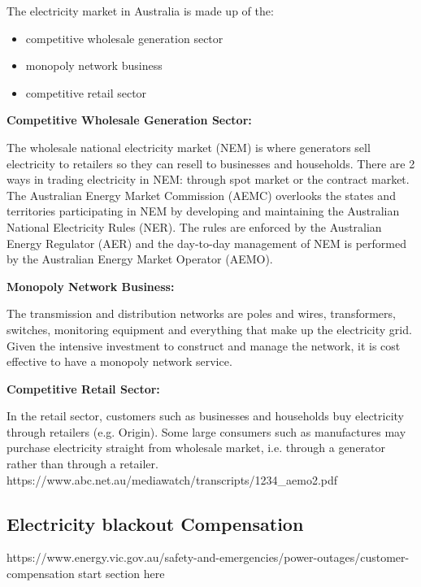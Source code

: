 \documentclass[12pt]{article}
\begin{document}
\begin{flushleft}
The electricity market in Australia is made up of the:
\begin{itemize}
 \item competitive wholesale generation sector
 \item monopoly network business
 \item competitive retail sector\parencite{aemc2}
\end{itemize}
{\textbf{\large Competitive Wholesale Generation Sector:}}\par
The wholesale national electricity market (NEM) is where generators sell electricity to retailers so they can resell to businesses and households. There are 2 ways in trading electricity in NEM: through spot market or the contract market.\parencite{aemc2} The Australian Energy Market Commission (AEMC) overlooks the states and territories participating in NEM by developing and maintaining the Australian National Electricity Rules (NER). The rules are enforced by the Australian Energy Regulator (AER) and the day-to-day management of NEM is performed by the Australian Energy Market Operator (AEMO).\parencite{aemo1} \par
{\textbf{\large Monopoly Network Business:}}\par
The transmission and distribution networks are poles and wires, transformers, switches, monitoring equipment and everything that make up the electricity grid. Given the intensive investment to construct and manage the network, it is cost effective to have a monopoly network service.\parencite{aemc2}\par
{\textbf{\large Competitive Retail Sector:}}\par
In the retail sector, customers such as businesses and households buy electricity through retailers (e.g. Origin). Some large consumers such as manufactures may purchase electricity straight from wholesale market, i.e. through a generator rather than through a retailer. \parencite{aemc2}
https://www.abc.net.au/mediawatch/transcripts/1234_aemo2.pdf
\end{flushleft}

\subsection{Electricity blackout Compensation}
\begin{flushleft}
https://www.energy.vic.gov.au/safety-and-emergencies/power-outages/customer-compensation
start section here
\end{flushleft}
\end{document}
